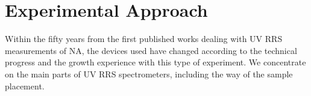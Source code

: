 \section{Experimental Approach}

Within the fifty years from the first published works dealing with UV RRS
measurements of NA, the devices used have changed according to the technical
progress and the growth experience with this type of experiment.
We concentrate on the main parts of UV RRS spectrometers, including the way of
the sample placement.









